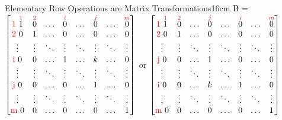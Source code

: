 \begin{definition}{Elementary Row Operations are Matrix Transformations}{16cm}
        \hspace{1cm}
        B =
        $\begin{bmatrix}
            \text{\color{red} 1 } \overset{{\color{red} 1}}{1}
                & \overset{{\color{red} 2}}{0} & \hdots
                & \overset{{\color{red} i}}{0} & \hdots
                & \overset{{\color{red} j}}{0} & \hdots
                & \overset{{\color{red} m}}{0} \\
            \text{\color{red} 2 } 0 & 1 & \hdots & 0 & \hdots & 0 & \hdots & 0 \\
            \vdots & \vdots & \ddots & \vdots & \ddots & \vdots & \ddots & \vdots \\
            \text{\color{red} i } 0 & 0 & \hdots & 1 & \hdots & k & \hdots & 0 \\
            \vdots & \vdots & \ddots & \vdots & \ddots & \vdots & \ddots & \vdots \\
            \text{\color{red} j } 0 & 0 & \hdots & 0 & \hdots & 1 & \hdots & 0 \\
            \vdots & \vdots & \ddots & \vdots & \ddots & \vdots & \ddots & \vdots \\
            \text{\color{red} m } 0 & 0 & \hdots & 0 & \hdots & 0 & \hdots & 1
        \end{bmatrix}$
        or
        $\begin{bmatrix}
            \text{\color{red} 1 } \overset{{\color{red} 1}}{1}
                & \overset{{\color{red} 2}}{0} & \hdots
                & \overset{{\color{red} j}}{0} & \hdots
                & \overset{{\color{red} i}}{0} & \hdots
                & \overset{{\color{red} m}}{0} \\
            \text{\color{red} 2 } 0 & 1 & \hdots & 0 & \hdots & 0 & \hdots & 0 \\
            \vdots & \vdots & \ddots & \vdots & \ddots & \vdots & \ddots & \vdots \\
            \text{\color{red} j } 0 & 0 & \hdots & 1 & \hdots & 0 & \hdots & 0 \\
            \vdots & \vdots & \ddots & \vdots & \ddots & \vdots & \ddots & \vdots \\
            \text{\color{red} i } 0 & 0 & \hdots & k & \hdots & 1 & \hdots & 0 \\
            \vdots & \vdots & \ddots & \vdots & \ddots & \vdots & \ddots & \vdots \\
            \text{\color{red} m } 0 & 0 & \hdots & 0 & \hdots & 0 & \hdots & 1
        \end{bmatrix}$


\end{definition}
